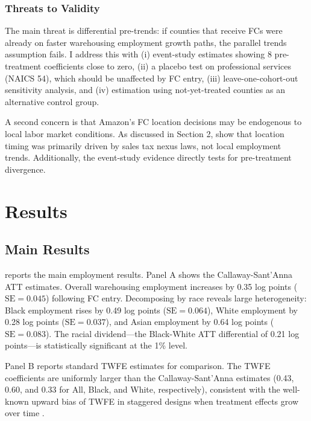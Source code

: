 \documentclass[12pt]{article}
\begin{document}
\subsubsection*{Threats to Validity} The main threat is differential pre-trends: if counties that receive FCs were already on faster warehousing employment growth paths, the parallel trends assumption fails. I address this with (i) event-study estimates showing 8 pre-treatment coefficients close to zero, (ii) a placebo test on professional services (NAICS 54), which should be unaffected by FC entry, (iii) leave-one-cohort-out sensitivity analysis, and (iv) estimation using not-yet-treated counties as an alternative control group.

A second concern is that Amazon's FC location decisions may be endogenous to local labor market conditions. As discussed in Section 2, \citet{HoudeNewberrySeim2023} show that location timing was primarily driven by sales tax nexus laws, not local employment trends. Additionally, the event-study evidence directly tests for pre-treatment divergence.


\section{Results}

\subsection{Main Results}



 reports the main employment results. Panel A shows the Callaway-Sant'Anna ATT estimates. Overall warehousing employment increases by 0.35 log points ($\text{SE} = 0.045$) following FC entry. Decomposing by race reveals large heterogeneity: Black employment rises by 0.49 log points ($\text{SE} = 0.064$), White employment by 0.28 log points ($\text{SE} = 0.037$), and Asian employment by 0.64 log points ($\text{SE} = 0.083$). The racial dividend---the Black-White ATT differential of 0.21 log points---is statistically significant at the 1\% level.

Panel B reports standard TWFE estimates for comparison. The TWFE coefficients are uniformly larger than the Callaway-Sant'Anna estimates (0.43, 0.60, and 0.33 for All, Black, and White, respectively), consistent with the well-known upward bias of TWFE in staggered designs when treatment effects grow over time \citep{GoodmanBacon2021, deChaisemartin2020}.
\end{document}
